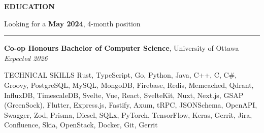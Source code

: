 \documentclass{resume}
\begin{document}
\color{primary}

\vspace{-8pt}

\sectionskip
\MakeUppercase{{\bf Education}}
\vspace{-21pt}
\begin{flushright}
	{Looking for a \textbf{May 2024}, 4-month position}
\end{flushright}
\sectionlineskip
\hrule
\begin{list}{}{
		\setlength{\leftmargin}{0em}
	}
	\item[] \textbf{Co-op Honours Bachelor of Computer Science}, University of Ottawa \hfill \textit{Expected 2026}
\end{list}

\vspace{-6pt}

\begin{rSection}{TECHNICAL SKILLS}
	Rust, TypeScript, Go, Python, Java, C++, C, C\#, Groovy,
	PostgreSQL, MySQL, MongoDB, Firebase, Redis, Memcached,
	Qdrant,
	InfluxDB, TimescaleDB,
	Svelte, Vue, React, SvelteKit, Nuxt, Next.js,
	GSAP (GreenSock), Flutter,
	Express.js, Fastify, Axum, tRPC,
	JSONSchema, OpenAPI, Swagger, Zod,
	Prisma, Diesel, SQLx,
	PyTorch, TensorFlow, Keras,
	Gerrit, Jira, Confluence,
	Skia, OpenStack, Docker,
	Git, Gerrit
\end{rSection}

\vspace{-8pt}
\end{document}
